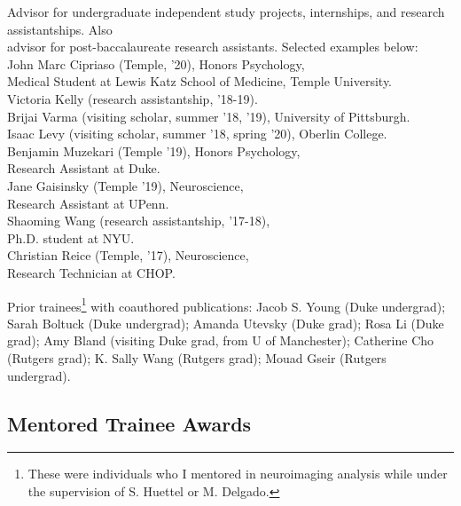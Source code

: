 \documentclass[11pt, letterpaper]{article}
\begin{document}
\begin{tabbing}
Advisor for undergraduate independent study projects, internships, and research assistantships. Also \\
\> advisor for post-baccalaureate research assistants. Selected examples below: \\  [.1cm]

\> John Marc Cipriaso (Temple, '20), Honors Psychology, \\
\> \> Medical Student at Lewis Katz School of Medicine, Temple University. \\
\> Victoria Kelly (research assistantship, '18-19). \\
\> Brijai Varma (visiting scholar, summer '18, '19), University of Pittsburgh. \\
\> Isaac Levy (visiting scholar, summer '18, spring '20), Oberlin College. \\
\> Benjamin Muzekari (Temple '19), Honors Psychology, \\
\> \> Research Assistant at Duke. \\
\> Jane Gaisinsky (Temple '19), Neuroscience, \\
\> \> Research Assistant at UPenn. \\
\> Shaoming Wang (research assistantship, '17-18), \\
\> \> Ph.D. student at NYU. \\
\> Christian Reice (Temple, '17), Neuroscience, \\
\> \> Research Technician at CHOP.

\end{tabbing}

\begin{hangparas}{.5in}{1}
Prior trainees\footnote{These were individuals who I mentored in neuroimaging analysis while under the supervision of S. Huettel or M. Delgado.} with coauthored publications: Jacob S. Young (Duke undergrad); Sarah Boltuck (Duke undergrad); Amanda Utevsky (Duke grad); Rosa Li (Duke grad); Amy Bland (visiting Duke grad, from U of Manchester); Catherine Cho (Rutgers grad); K. Sally Wang (Rutgers grad); Mouad Gseir (Rutgers undergrad). \\ [.1cm]
\end{hangparas}


\subsection*{Mentored Trainee Awards}
\end{document}
